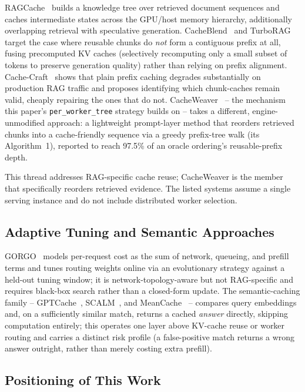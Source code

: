 \documentclass[conference]{IEEEtran}
\begin{document}
RAGCache~\cite{ragcache2024} builds a knowledge tree over retrieved
document sequences and caches intermediate states across the GPU/host
memory hierarchy, additionally overlapping retrieval with speculative
generation. CacheBlend~\cite{cacheblend2025} and
TurboRAG~\cite{turborag2025} target the case where reusable chunks do
\emph{not} form a contiguous prefix at all, fusing precomputed KV
caches (selectively recomputing only a small subset of tokens to
preserve generation quality) rather than relying on prefix alignment.
Cache-Craft~\cite{cachecraft2025} shows that plain prefix caching
degrades substantially on production RAG traffic and proposes
identifying which chunk-caches remain valid, cheaply repairing the
ones that do not. CacheWeaver~\cite{cacheweaver2026} -- the mechanism
this paper's \texttt{per\_worker\_tree} strategy builds on -- takes a
different, engine-unmodified approach: a lightweight prompt-layer
method that reorders retrieved chunks into a cache-friendly sequence
via a greedy prefix-tree walk (its Algorithm~1), reported to reach
97.5\% of an oracle ordering's reusable-prefix depth.

This thread addresses RAG-specific cache reuse; CacheWeaver is the
member that specifically reorders retrieved evidence. The listed
systems assume a single serving instance and do not include distributed
worker selection.

\subsection{Adaptive Tuning and Semantic Approaches}

GORGO~\cite{gorgo2026} models per-request cost as the sum of network,
queueing, and prefill terms and tunes routing weights online via an
evolutionary strategy against a held-out tuning window; it is
network-topology-aware but not RAG-specific and requires black-box
search rather than a closed-form update. The semantic-caching family
-- GPTCache~\cite{gptcache2023}, SCALM~\cite{scalm2024}, and
MeanCache~\cite{meancache2024} -- compares query embeddings and, on a
sufficiently similar match, returns a cached \emph{answer} directly,
skipping computation entirely; this operates one layer above KV-cache
reuse or worker routing and carries a distinct risk profile (a
false-positive match returns a wrong answer outright, rather than
merely costing extra prefill).

\subsection{Positioning of This Work}
\end{document}

